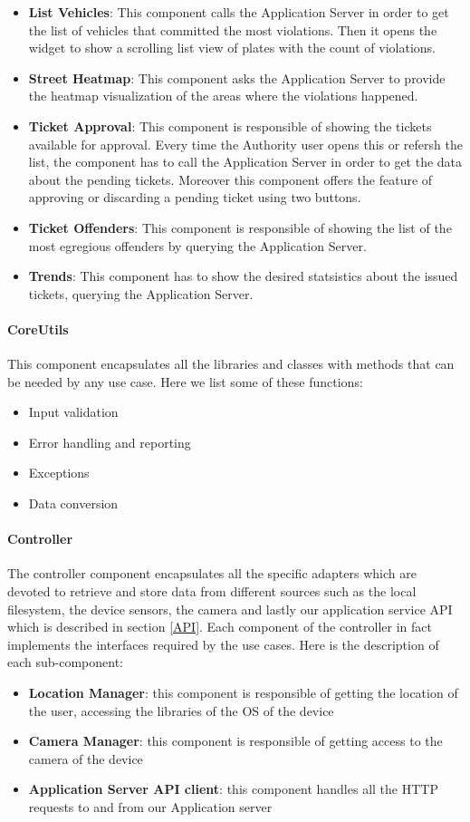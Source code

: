 \begin{itemize}
  \item \textbf{List Vehicles}: This component calls the Application Server in order to get the list of vehicles that committed the most violations. Then it opens the widget to show a scrolling list view of plates with the count of violations.
  \item \textbf{Street Heatmap}: This component asks the Application Server to provide the heatmap visualization of the areas where the violations happened.
  \item \textbf{Ticket Approval}: This component is responsible of showing the tickets available for approval. Every time the Authority user opens this or refersh the list, the component has to call the Application Server in order to get the data about the pending tickets. Moreover this component offers the feature of approving or discarding a pending ticket using two buttons.
  \item \textbf{Ticket Offenders}: This component is responsible of showing the list of the most egregious offenders by querying the Application Server.
  \item \textbf{Trends}: This component has to show the desired statsistics about the issued tickets, querying the Application Server.
\end{itemize}

\paragraph{CoreUtils}
This component encapsulates all the libraries and classes with methods that can be needed by any use case.
Here we list some of these functions:
\begin{itemize}
  \item Input validation
  \item Error handling and reporting
  \item Exceptions
  \item Data conversion
\end{itemize}

\paragraph{Controller}
The controller component encapsulates all the specific adapters which are devoted to retrieve and store data from different sources such as the local filesystem, the device sensors, the camera and lastly our application service API which is described in section \ref{API}.
Each component of the controller in fact implements the interfaces required by the use cases.
Here is the description of each sub-component:
\begin{itemize}
  \item \textbf{Location Manager}: this component is responsible of getting the location of the user, accessing the libraries of the OS of the device
  \item \textbf{Camera Manager}: this component is responsible of getting access to the camera of the device
  \item \textbf{Application Server API client}: this component handles all the HTTP requests to and from our Application server
\end{itemize}

